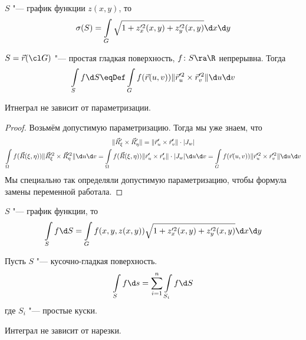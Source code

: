 \begin{conseq}
	$S$ "--- график функции $z(x, y)$, то
	\[
		\sigma(S) = \int\limits_G \sqrt{1 + z_x'^2(x, y) + z_y'^2(x, y)} \d x \d y
	\]
\end{conseq}

\begin{Def}
	$S = \vec r(\cl G)$ "--- простая гладкая поверхность, $f\colon S \ra \R$ непрерывна.
	Тогда
	\[
		\int\limits_S f \d S \eqDef \int\limits_G f(\vec r(u, v)) \| \vec r_u'^2 \times \vec r_v'^2 \| \d u \d v
	\]
\end{Def}

\begin{theorem}
	Итнеграл не зависит от параметризации.
\end{theorem}
\begin{proof}
	Возьмём допустимую параметризацию. Тогда мы уже знаем, что
	\begin{gather*}
		\|\vec R_\xi' \times \vec R_\eta'\| = \|\vec r_u' \times \vec r_v'\| \cdot |J_w| \\
		\int\limits_\Omega f(\vec R(\xi, \eta)) \| \vec R_\xi'^2 \times \vec R_\eta'^2 \| \d u \d v
		= \int\limits_\Omega f(\vec R(\xi, \eta)) \|\vec r_u' \times \vec r_v'\| \cdot |J_w| \d u \d v
		= \int\limits_G f(\vec r(u, v)) \| \vec r_u'^2 \times \vec r_v'^2 \| \d u \d v
	\end{gather*}
	Мы специально так определяли допустимую параметризацию, чтобы формула замены переменной работала.
\end{proof}

\begin{Rem}
	$S$ "--- график функции, то
	\[ \int\limits_S f \d S = \int\limits_G f(x, y, z(x, y)) \sqrt{1 + z_x'^2(x, y) + z_y'^2(x, y)} \d x \d y \]
\end{Rem}

\begin{Def}
	Пусть $S$ "--- кусочно-гладкая поверхность.
	\[ \int\limits_S f \d s = \sum_{i=1}^n \int\limits_{S_i} f \d S \]
	где $S_i$ "--- простые куски.
\end{Def}

\begin{Rem}
	Интеграл не зависит от нарезки.
\end{Rem}
